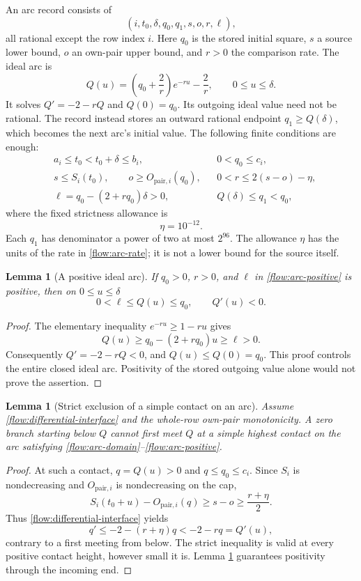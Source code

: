 \documentclass[11pt,a4paper]{article}
\newtheorem{lemma}[theorem]{Lemma}
\theoremstyle{definition}
\theoremstyle{remark}
\begin{document}
An arc record consists of
\[
 (i,t_0,\delta,q_0,q_1,s,o,r,\ell),
\]
all rational except the row index $i$.  Here $q_0$ is the stored initial
square, $s$ a source lower bound, $o$ an own-pair upper bound, and $r>0$
the comparison rate.  The ideal arc is
\begin{equation}
 Q(u)=\left(q_0+\frac2r\right)e^{-ru}-\frac2r,
 \qquad 0\leq u\leq\delta.
 \label{flow:ideal}
\end{equation}
It solves $Q'=-2-rQ$ and $Q(0)=q_0$.  Its outgoing ideal value need
not be rational.  The record instead stores an outward rational endpoint
$q_1\geq Q(\delta)$, which becomes the next arc's initial value.
The following finite conditions are enough:
\begin{align}
 &a_i\leq t_0<t_0+\delta\leq b_i,
       &&0<q_0\leq c_i,\label{flow:arc-domain}\\
 &s\leq S_i(t_0),\qquad o\geq O_{\mathrm{pair},i}(q_0),
       &&0<r\leq2(s-o)-\eta,\label{flow:arc-rate}\\
 &\ell=q_0-(2+rq_0)\delta>0,
       &&Q(\delta)\leq q_1<q_0,
 \label{flow:arc-positive}
\end{align}
where the fixed strictness allowance is
\begin{equation}
 \eta=10^{-12}.
 \label{flow:eta}
\end{equation}
Each $q_1$ has denominator a power of two at most $2^{96}$.
The allowance $\eta$ has the units of the rate in
\eqref{flow:arc-rate}; it is not a lower bound for the source itself.

\begin{lemma}[A positive ideal arc]
\label{flow:positive-arc}
If $q_0>0$, $r>0$, and $\ell$ in
\eqref{flow:arc-positive} is positive, then on $0\leq u\leq\delta$
\[
 0<\ell\leq Q(u)\leq q_0,
 \qquad Q'(u)<0.
\]
\end{lemma}
\begin{proof}
The elementary inequality $e^{-ru}\geq1-ru$ gives
\[
 Q(u)\geq q_0-(2+rq_0)u\geq\ell>0.
\]
Consequently $Q'=-2-rQ<0$, and $Q(u)\leq Q(0)=q_0$.
This proof controls the entire closed ideal arc.  Positivity of the stored
outgoing value alone would not prove the assertion.
\end{proof}

\begin{lemma}[Strict exclusion of a simple contact on an arc]
\label{flow:strict-arc}
Assume \eqref{flow:differential-interface} and the whole-row own-pair
monotonicity.  A zero branch starting below $Q$ cannot first meet $Q$ at
a simple highest contact on the arc satisfying
\eqref{flow:arc-domain}--\eqref{flow:arc-positive}.
\end{lemma}
\begin{proof}
At such a contact, $q=Q(u)>0$ and $q\leq q_0\leq c_i$.  Since $S_i$
is nondecreasing and $O_{\mathrm{pair},i}$ is nondecreasing on the cap,
\[
 S_i(t_0+u)-O_{\mathrm{pair},i}(q)\geq s-o\geq\frac{r+\eta}{2}.
\]
Thus \eqref{flow:differential-interface} yields
\[
 q'\leq-2-(r+\eta)q
     < -2-rq=Q'(u),
\]
contrary to a first meeting from below.  The strict inequality is valid
at every positive contact height, however small it is.  Lemma
\ref{flow:positive-arc} guarantees positivity through the incoming end.
\end{proof}
\end{document}
